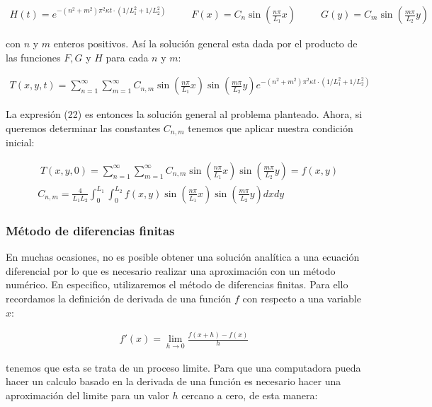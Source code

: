 \documentclass[12pt]{article}
\begin{document}
\begin{align*}
    H(t)=e^{-(n^2+m^2)\pi^2\kappa t\cdot(1/L_1^2 + 1/L_2^2)} \;\;\;\;\;\;\;\;\; F(x)=C_n \sin \left(\frac{n\pi}{L_1}x\right) \;\;\;\;\;\;\;\;\; G(y) = C_m \sin \left(\frac{m\pi}{L_2}y\right)
\end{align*}

con $n$ y $m$ enteros positivos. Así la solución general esta dada por el producto de las funciones $F, G$ y $H$ para cada $n$ y $m$:

\begin{align}
    T(x,y,t) = \sum_{n=1}^{\infty}\sum_{m=1}^{\infty} C_{n,m}\sin \left(\frac{n\pi}{L_1}x\right)\sin \left(\frac{m\pi}{L_2}y\right)e^{-(n^2+m^2)\pi^2\kappa t\cdot(1/L_1^2 + 1/L_2^2)}
\end{align}

La expresión (22) es entonces la solución general al problema planteado. Ahora, si queremos determinar las constantes $C_{n,m}$ tenemos que aplicar nuestra condición inicial:

\begin{align}
    \nonumber &\;T(x,y,0) = \sum_{n=1}^{\infty}\sum_{m=1}^{\infty} C_{n,m}\sin \left(\frac{n\pi}{L_1}x\right)\sin \left(\frac{m\pi}{L_2}y\right) = f(x,y) \\
    &C_{n,m} = \frac{4}{L_1L_2}\int_{0}^{L_1}\int_{0}^{L_2}f(x,y)\sin \left(\frac{n\pi}{L_1}x\right)\sin \left(\frac{m\pi}{L_2}y\right)dxdy
\end{align}

\subsubsection{Método de diferencias finitas}

En muchas ocasiones, no es posible obtener una solución analítica a una ecuación diferencial por lo que es necesario realizar una aproximación con un método numérico. En especifico, utilizaremos el método de diferencias finitas. Para ello recordamos la definición de derivada de una función $f$ con respecto a una variable $x$:

\begin{align*}
    f'(x) = \lim_{h\rightarrow 0}\frac{f(x+h)-f(x)}{h}
\end{align*}

tenemos que esta se trata de un proceso limite. Para que una computadora pueda hacer un calculo basado en la derivada de una función es necesario hacer una aproximación del limite para un valor $h$ cercano a cero, de esta manera:
\end{document}
